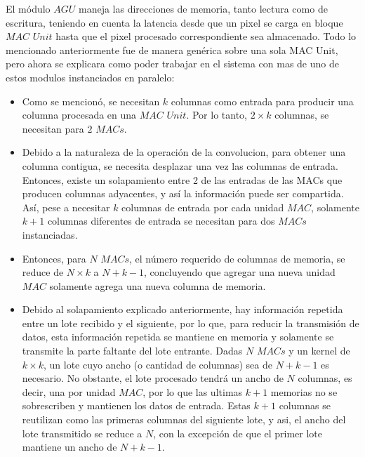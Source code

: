 \documentclass[a4paper]{article}
\begin{document}
El módulo $AGU$ maneja las direcciones de memoria, tanto lectura como de escritura, teniendo en cuenta la latencia desde que un pixel se carga en bloque $MAC$ $Unit$ hasta que el pixel procesado correspondiente sea almacenado.
Todo lo mencionado anteriormente fue de manera genérica sobre una sola MAC Unit, pero ahora se explicara como poder trabajar en el sistema con mas de uno de estos modulos instanciados en paralelo:
\begin{frame}{}

    
      \begin{itemize}

\item Como se mencionó,  se necesitan $k$ columnas como entrada para producir una columna procesada en una $MAC$ $Unit$. Por lo tanto, $2 \times k$ columnas, se necesitan para $2$ $MACs$.
\item Debido a la naturaleza de la operación de la convolucion, para obtener una columna contigua, se necesita desplazar una vez las columnas de entrada. Entonces, existe un solapamiento entre 2 de las entradas de las MACs que producen columnas adyacentes, y así la información puede ser compartida.
Así, pese a necesitar $k$ columnas de entrada por cada unidad $MAC$, solamente $k+1$ columnas diferentes de entrada se necesitan para dos $MACs$ instanciadas.
\item Entonces, para $N$ $MACs$, el número requerido de columnas de memoria, se reduce de $N \times k$ a $N+k-1$, concluyendo que agregar una nueva unidad $MAC$ solamente agrega una nueva columna de memoria.
\item Debido al solapamiento explicado anteriormente, hay información repetida entre un lote recibido y el siguiente, por lo que, para reducir la transmisión de datos, esta información repetida se mantiene en memoria y solamente se transmite la parte faltante del lote entrante.
Dadas $N$ $MACs$ y  un kernel de $k \times k$, un lote cuyo ancho (o cantidad de columnas) sea de $N+k-1$ es necesario. No obstante, el lote procesado tendrá un ancho de  $N$ columnas, es decir, una por unidad $MAC$, por lo que las ultimas $k+1$ memorias no se sobrescriben y mantienen los datos de entrada. Estas $k+1$ columnas se reutilizan como las primeras columnas del siguiente lote, y asi, el ancho del lote transmitido se reduce a $N$, con la excepción de que el primer lote mantiene un ancho de $N+k-1$.

      \end{itemize}
     
\end{frame}
\end{document}
